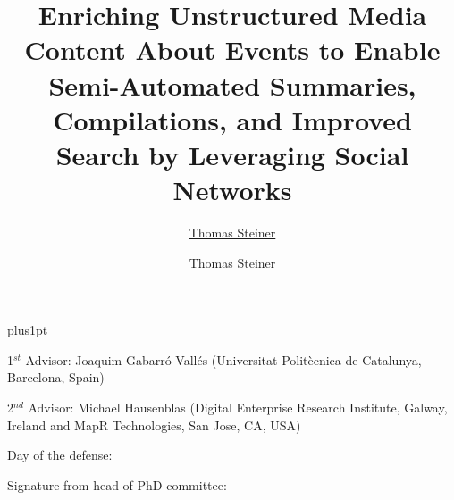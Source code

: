 \documentclass[twoside,11pt]{Latex/Classes/PhDthesisPSnPDF}
\title{Enriching Unstructured Media Content About Events to Enable Semi-Automated Summaries, Compilations, and Improved Search by Leveraging Social Networks}
\author{\href{mailto:tsteiner@lsi.upc.edu}{Thomas Steiner}}
\author{Thomas Steiner}
\begin{document}

\renewcommand\baselinestretch{1.2}
\baselineskip=18pt plus1pt



\maketitle  %



\newpage
\vspace{10mm}
1$^{st}$ Advisor: Joaquim Gabarró Vallés (Universitat Politècnica de Catalunya, Barcelona, Spain)

\vspace{10mm}
2$^{nd}$ Advisor: Michael Hausenblas (Digital Enterprise Research Institute, Galway, Ireland and MapR Technologies, San Jose, CA, USA)

\vspace{20mm}
Day of the defense: 

\vspace{20mm}
\hspace{70mm}Signature from head of PhD committee:







%   



\frontmatter


\end{document}
